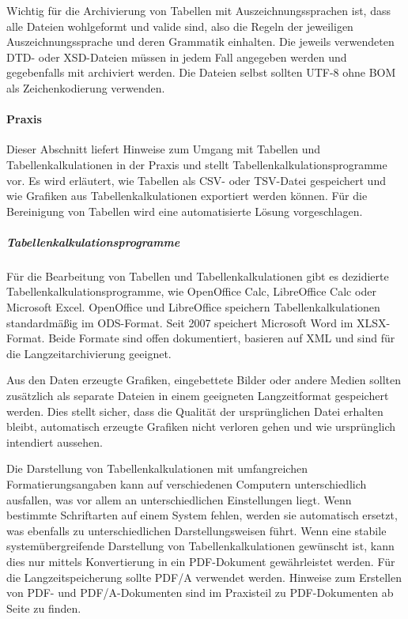 Wichtig für die Archivierung von Tabellen mit Auszeichnungssprachen ist, dass alle Dateien wohlgeformt und valide sind, also die Regeln der jeweiligen Auszeichnungssprache und deren Grammatik einhalten. Die jeweils verwendeten DTD- oder XSD-Dateien müssen in jedem Fall angegeben werden und gegebenfalls mit archiviert werden. Die Dateien selbst sollten UTF-8 ohne BOM als Zeichenkodierung verwenden. 


\paragraph{Praxis}
Dieser Abschnitt liefert Hinweise zum Umgang mit Tabellen und Tabellenkalkulationen in der Praxis und stellt Tabellenkalkulationsprogramme vor. Es wird erläutert, wie Tabellen als CSV- oder TSV-Datei gespeichert und wie Grafiken aus Tabellenkalkulationen exportiert werden können. Für die Bereinigung von Tabellen wird eine automatisierte Lösung vorgeschlagen.

\subparagraph{Tabellenkalkulationsprogramme}
Für die Bearbeitung von Tabellen und Tabellenkalkulationen gibt es dezidierte Tabellenkalkulationsprogramme, wie OpenOffice Calc, LibreOffice Calc oder Microsoft Excel. OpenOffice und LibreOffice speichern Tabellenkalkulationen standardmäßig im ODS-Format. Seit 2007 speichert Microsoft Word im XLSX-Format. Beide Formate sind offen dokumentiert, basieren auf XML und sind für die Langzeitarchivierung geeignet.

Aus den Daten erzeugte Grafiken, eingebettete Bilder oder andere Medien sollten zusätzlich als separate Dateien in einem geeigneten Langzeitformat gespeichert werden. Dies stellt sicher, dass die Qualität der ursprünglichen Datei erhalten bleibt, automatisch erzeugte Grafiken nicht verloren gehen und wie ursprünglich intendiert aussehen.

Die Darstellung von Tabellenkalkulationen mit umfangreichen Formatierungsangaben kann auf verschiedenen Computern unterschiedlich ausfallen, was vor allem an unterschiedlichen Einstellungen liegt. Wenn bestimmte Schriftarten auf einem System fehlen, werden sie automatisch ersetzt, was ebenfalls zu unterschiedlichen Darstellungsweisen führt. Wenn eine stabile systemübergreifende Darstellung von Tabellenkalkulationen gewünscht ist, kann dies nur mittels Konvertierung in ein PDF-Dokument gewährleistet werden. Für die Langzeitspeicherung sollte PDF/A verwendet werden. Hinweise zum Erstellen von PDF- und PDF/A-Dokumenten sind im Praxisteil zu PDF-Dokumenten ab Seite \pageref{pdf-dokumenteErstellen} zu finden.

